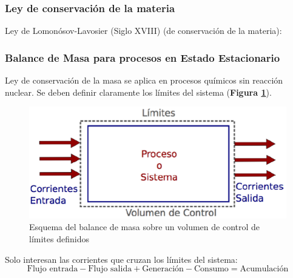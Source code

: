         \subsubsection{Ley de conservación de la materia}
        
        Ley de Lomonósov-Lavosier (Siglo XVIII) (de conservación de la materia):
        
        \begin{quote}
            \textit{}
        \end{quote}
        
        \subsubsection{Balance de Masa para procesos en Estado Estacionario}
        
            
            Ley de conservación de la masa se aplica en procesos químicos sin reacción nuclear. Se deben definir claramente los límites del sistema (\textbf{Figura \ref{fig:balance_masa_esq}}).
            
            \begin{figure}
                \centering
                \includegraphics[width=.7\textwidth]{img/esquemas/balance_masa_esq.png}
                \caption{Esquema del balance de masa sobre un volumen de control de límites definidos}
                \label{fig:balance_masa_esq}
            \end{figure}
            
            Solo interesan las corrientes que cruzan los límites del sistema:
            \begin{equation}
            \label{eq:balance_masa}
                \text{Flujo entrada} - \text{Flujo salida} + \text{Generación} - \text{Consumo} = \text{Acumulación}
            \end{equation}
            

